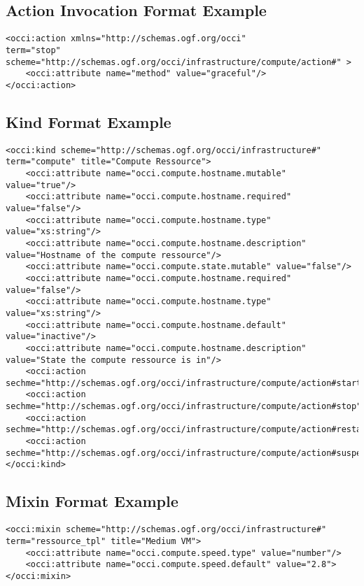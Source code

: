 \documentclass[10pt,a4paper]{article}
\begin{document}
\subsection{Action Invocation Format Example}
\label{sec:example_action_invocation}
\begin{lstlisting}
<occi:action xmlns="http://schemas.ogf.org/occi"
term="stop" scheme="http://schemas.ogf.org/occi/infrastructure/compute/action#" >
	<occi:attribute name="method" value="graceful"/>
</occi:action>
\end{lstlisting}

\subsection{Kind Format Example}
\label{sec:example_kind}
\begin{lstlisting}
<occi:kind scheme="http://schemas.ogf.org/occi/infrastructure#" term="compute" title="Compute Ressource">
	<occi:attribute name="occi.compute.hostname.mutable" value="true"/>
	<occi:attribute name="occi.compute.hostname.required" value="false"/>
	<occi:attribute name="occi.compute.hostname.type" value="xs:string"/>
	<occi:attribute name="occi.compute.hostname.description" value="Hostname of the compute ressource"/>
	<occi:attribute name="occi.compute.state.mutable" value="false"/>
	<occi:attribute name="occi.compute.hostname.required" value="false"/>
	<occi:attribute name="occi.compute.hostname.type" value="xs:string"/>
	<occi:attribute name="occi.compute.hostname.default" value="inactive"/>
	<occi:attribute name="occi.compute.hostname.description" value="State the compute ressource is in"/>
	<occi:action sechme="http://schemas.ogf.org/occi/infrastructure/compute/action#start"/>
	<occi:action sechme="http://schemas.ogf.org/occi/infrastructure/compute/action#stop"/>
	<occi:action sechme="http://schemas.ogf.org/occi/infrastructure/compute/action#restart"/>
	<occi:action sechme="http://schemas.ogf.org/occi/infrastructure/compute/action#suspend"/>
</occi:kind>
\end{lstlisting}

\subsection{Mixin Format Example}
\label{sec:example_mixin}
\begin{lstlisting}
<occi:mixin scheme="http://schemas.ogf.org/occi/infrastructure#" term="ressource_tpl" title="Medium VM">
	<occi:attribute name="occi.compute.speed.type" value="number"/>
	<occi:attribute name="occi.compute.speed.default" value="2.8">		
</occi:mixin>
\end{lstlisting}
\end{document}
